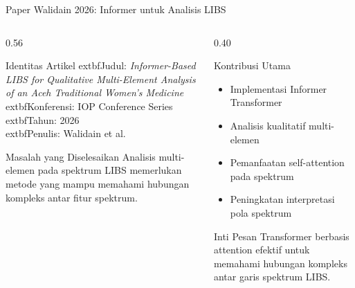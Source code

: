 \documentclass[aspectratio=169,10pt]{beamer}
\begin{document}
\begin{frame}{Paper Walidain 2026: Informer untuk Analisis LIBS}

\begin{columns}[T]

\begin{column}{0.56\textwidth}

\begin{block}{Identitas Artikel}
\small
	extbf{Judul}: \textit{Informer-Based LIBS for Qualitative Multi-Element Analysis of an Aceh Traditional Women’s Medicine}\\[4pt]

	extbf{Konferensi}: IOP Conference Series\\
	extbf{Tahun}: 2026\\[4pt]

	extbf{Penulis}: Walidain et al.
\end{block}

\begin{exampleblock}{Masalah yang Diselesaikan}
\small
Analisis multi-elemen pada spektrum LIBS memerlukan metode yang mampu memahami hubungan kompleks antar fitur spektrum.
\end{exampleblock}

\end{column}

\begin{column}{0.40\textwidth}

\begin{block}{Kontribusi Utama}
\small
\begin{itemize}
\item Implementasi Informer Transformer
\item Analisis kualitatif multi-elemen
\item Pemanfaatan self-attention pada spektrum
\item Peningkatan interpretasi pola spektrum
\end{itemize}
\end{block}

\begin{alertblock}{Inti Pesan}
\small
Transformer berbasis attention efektif untuk memahami hubungan kompleks antar garis spektrum LIBS.
\end{alertblock}

\end{column}

\end{columns}

\end{frame}
\end{document}
